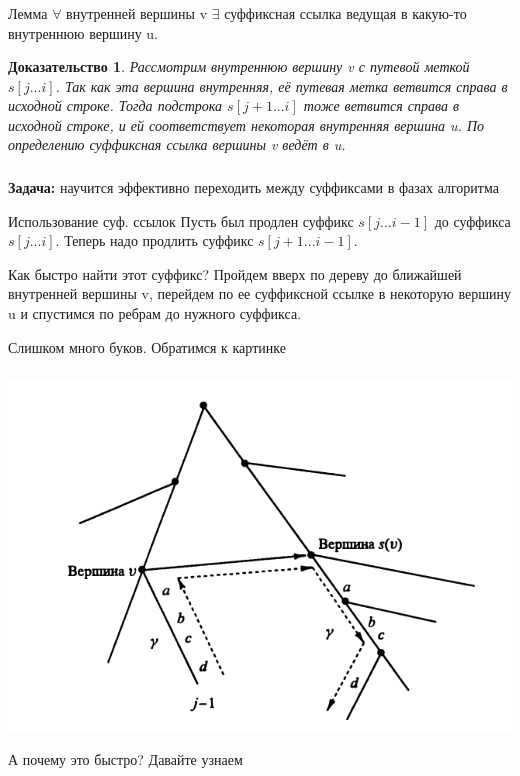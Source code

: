 \documentclass[t]{beamer}  %
\newtheorem{rproof}{Доказательство}
\begin{document}
\begin{frame}
	\frametitle{\insertsubsection}
	\begin{block}{Лемма}
		$\forall$ внутренней вершины v $\exists$ суффиксная ссылка ведущая в какую-то внутреннюю вершину u. 
	\end{block}
	
	\pause
	\begin{rproof}
		Рассмотрим внутреннюю вершину v с путевой меткой $s[j...i]$. \pause
		 Так как эта вершина внутренняя, её путевая метка ветвится справа в исходной строке. \pause Тогда подстрока $s[j+1...i]$ тоже ветвится справа в исходной строке, и ей соответствует некоторая внутренняя вершина u. По определению суффиксная ссылка вершины v ведёт в u.
	\end{rproof}
\end{frame}

\begin{frame}
	\frametitle{\insertsubsection}
	
	\textbf{Задача:} научится эффективно переходить между суффиксами в фазах алгоритма
	\pause
	
	\begin{block}{Использование суф. ссылок}
		Пусть был продлен суффикс $s[j...i-1]$ до суффикса $s[j...i]$. Теперь надо продлить суффикс $s[j+1...i-1]$.
		
		Как быстро найти этот суффикс? \pause
		Пройдем вверх по дереву до ближайшей внутренней вершины v, перейдем по ее суффиксной ссылке в некоторую вершину u и спустимся по ребрам до нужного суффикса.
	\end{block}
	
	\pause Слишком \pause много \pause буков. \pause
	Обратимся к картинке
\end{frame}

\begin{frame}	
	\frametitle{\insertsubsection}
	
	\includegraphics[width=\linewidth]{SuffixLink}
	
	А почему это быстро? \pause 
	Давайте узнаем
\end{frame}
\end{document}
